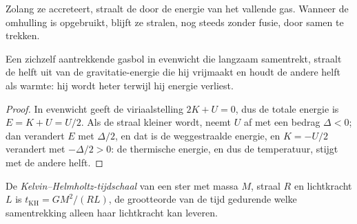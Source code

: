 \begin{omfigure}
\par{}
\end{omfigure}

Zolang ze accreteert, straalt de  door de energie van het vallende gas. Wanneer
de omhulling is opgebruikt, blijft ze stralen, nog steeds zonder fusie, door
samen te trekken.

\begin{proposition}
\label{prop:b2:ism-star-formation:contraction}
Een zichzelf aantrekkende gasbol in evenwicht die langzaam samentrekt, straalt
de helft uit van de gravitatie-energie die hij vrijmaakt en houdt de andere helft als warmte:
hij wordt heter terwijl hij energie verliest.
\end{proposition}

\begin{proof}
In evenwicht geeft de viriaalstelling $2K + U = 0$, dus de totale energie is
$E = K + U = U/2$. Als de straal kleiner wordt, neemt $U$ af met een bedrag
$\Delta < 0$; dan verandert $E$ met $\Delta/2$, en dat is de weggestraalde
energie, en $K = -U/2$ verandert met $-\Delta/2 > 0$: de thermische energie, en dus
de temperatuur, stijgt met de andere helft.
\end{proof}

\begin{definition}\label{def:b2:ism-star-formation:kh-time}
De \emph{Kelvin--Helmholtz-tijdschaal}
van een ster met massa $M$, straal $R$ en lichtkracht $L$ is
$t_{\mathrm{KH}} = GM^2/(RL)$, de grootteorde van de tijd gedurende welke
samentrekking alleen haar lichtkracht kan leveren.
\end{definition}

